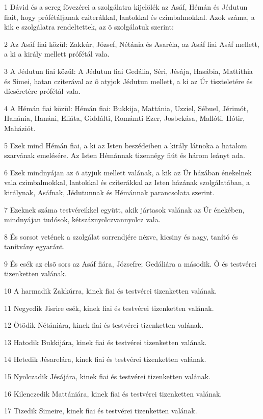 \par 1 Dávid és a sereg fõvezérei a szolgálatra kijelölék az Asáf, Hémán és Jédutun fiait, hogy prófétáljanak  cziterákkal, lantokkal és czimbalmokkal. Azok száma, a kik e szolgálatra rendeltettek, az õ szolgálatuk szerint:
\par 2 Az Asáf fiai közül: Zakkúr, József, Nétánia és Asaréla, az Asáf fiai Asáf mellett, a ki a király mellett prófétál vala.
\par 3 A Jédutun fiai közül: A Jédutun fiai Gedália, Séri, Jésája, Hasábia, Mattithia és Simei, hatan cziterával az õ atyjok Jédutun mellett, a ki az Úr tiszteletére és dícséretére prófétál vala.
\par 4 A Hémán fiai közül: Hémán fiai: Bukkija, Mattánia, Uzziel, Sébuel, Jérimót, Hanánia, Hanáni, Eliáta, Giddálti, Romámti-Ezer, Josbekása, Mallóti, Hótir, Maháziót.
\par 5 Ezek mind Hémán fiai, a ki az Isten beszédeiben a király látnoka a hatalom szarvának emelésére. Az Isten Hémánnak tizennégy fiút és három leányt ada.
\par 6 Ezek mindnyájan az õ atyjuk mellett valának, a kik az Úr házában énekelnek vala czimbalmokkal, lantokkal és cziterákkal az Isten házának szolgálatában, a királynak, Asáfnak, Jédutunnak és Hémánnak parancsolata szerint.
\par 7 Ezeknek száma testvéreikkel együtt, akik jártasok valának az Úr énekében, mindnyájan tudósok, kétszáznyolczvannyolcz vala.
\par 8 És sorsot vetének a szolgálat sorrendjére nézve, kicsiny és nagy, tanító és tanítvány egyaránt.
\par 9 És esék az elsõ sors az Asáf fiára, Józsefre; Gedáliára a második. Õ és testvérei tizenketten valának.
\par 10 A harmadik Zakkúrra, kinek fiai és testvérei tizenketten valának.
\par 11 Negyedik Jisrire esék, kinek fiai és testvérei tizenketten valának.
\par 12 Ötödik Nétániára, kinek fiai és testvérei tizenketten valának.
\par 13 Hatodik Bukkijára, kinek fiai és testvérei tizenketten valának.
\par 14 Hetedik Jésarelára, kinek fiai és testvérei tizenketten valának.
\par 15 Nyolczadik Jésájára, kinek fiai és testvérei tizenketten valának.
\par 16 Kilenczedik Mattániára, kinek fiai és testvérei tizenketten valának.
\par 17 Tizedik Simeire, kinek fiai és testvérei tizenketten valának.
